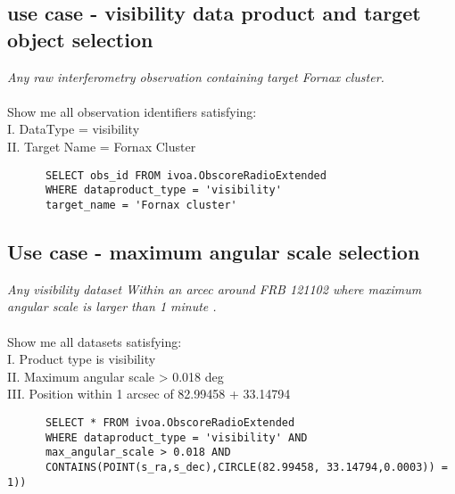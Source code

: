 
\subsection{ use case - visibility data product and target object selection }
\textit{Any raw interferometry observation containing target Fornax cluster.}\\
\\
Show me all  observation identifiers satisfying:\\
I. DataType = visibility \\
II. Target Name = Fornax Cluster \\
\begin{verbatim}
      SELECT obs_id FROM ivoa.ObscoreRadioExtended
      WHERE dataproduct_type = 'visibility'
      target_name = 'Fornax cluster'
\end{verbatim}





\subsection{Use case - maximum angular scale selection}
\textit{Any visibility dataset Within an arcec around FRB 121102  where  maximum angular scale is larger than 1 minute .}\\ \\
Show me all datasets satisfying:\\
I. Product type is visibility \\
II. Maximum angular scale  >  0.018 deg \\
III. Position within 1 arcsec of 82.99458 + 33.14794
\begin{verbatim}
      SELECT * FROM ivoa.ObscoreRadioExtended
      WHERE dataproduct_type = 'visibility' AND
      max_angular_scale > 0.018 AND
      CONTAINS(POINT(s_ra,s_dec),CIRCLE(82.99458, 33.14794,0.0003)) = 1))
\end{verbatim}

